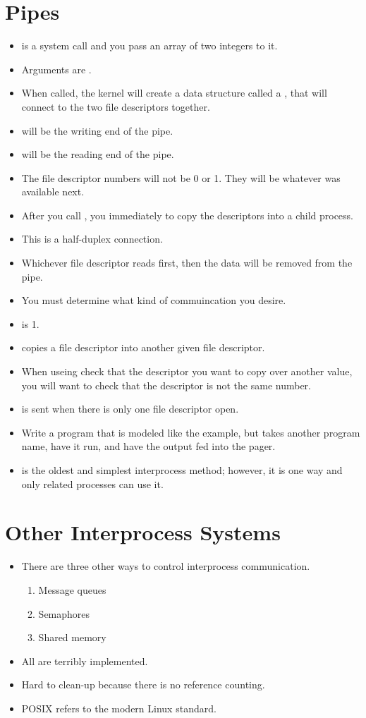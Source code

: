 \documentclass[]{article}
\begin{document}
\section{Pipes}
\begin{itemize}
\item {} is a system call and you pass an array of two integers to it.
\item Arguments are .
\item When called, the kernel will create a data structure called a ,
that will connect to the two file descriptors together.
\item {} will be the writing end of the pipe.
\item {} will be the reading end of the pipe.
\item The file descriptor numbers will not be 0 or 1. They will be whatever was
available next.
\item After you call , you immediately  to copy the
descriptors into a child process.
\item This is a half-duplex connection.
\item Whichever file descriptor reads first, then the data will be removed from
the pipe.
\item You must determine what kind of commuincation you desire.
\item {} is 1.
\item {} copies a file descriptor into another given file descriptor.
\item When useing  check that the descriptor you want to copy over
another value, you will want to check that the descriptor is not the same
number.
\item {} is sent when there is only one file descriptor open.
\item Write a program that is modeled like the example, but takes another
program name, have it run, and have the output fed into the pager.
\item {} is the oldest and simplest interprocess method; however, it is
one way and only related processes can use it.
\end{itemize}

\section{Other Interprocess Systems}
\begin{itemize}
\item There are three other ways to control interprocess communication.
\begin{enumerate}
\item Message queues
\item Semaphores
\item Shared memory
\end{enumerate}
\item All are terribly implemented.
\item Hard to clean-up because there is no reference counting.
\item POSIX refers to the modern Linux standard.
\end{itemize}
\end{document}
